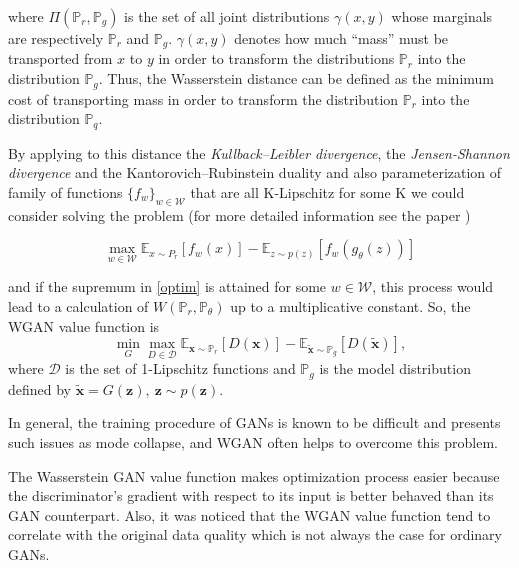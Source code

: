 \documentclass{webofc}
\begin{document}
where $\Pi(\mathbb{P}_r, \mathbb{P}_g)$ is the set of all joint distributions $\gamma(x, y)$ whose marginals are respectively $\mathbb{P}_r$ and $\mathbb{P}_g$. $\gamma(x, y)$ denotes how much “mass” must be transported from $x$ to $y$ in order to transform the distributions $\mathbb{P}_r$ into the distribution $\mathbb{P}_g$. Thus, the Wasserstein distance can be defined as the minimum cost of transporting mass in order to transform the distribution $\mathbb{P}_r$ into the distribution $\mathbb{P}_q$. 

By applying to this distance the \emph{Kullback--Leibler divergence}, the \emph{Jensen-Shannon divergence} and the Kantorovich--Rubinstein duality and also parameterization of family of functions $\{f_w\}_{w \in \mathcal{W}}$ that are all K-Lipschitz for some K we could consider solving the problem (for more detailed information see the paper \cite{arjovsky2017wasserstein})

\begin{equation}\label{optim}
\max_{w \in \mathcal{W}} \mathbb{E}_{x \sim P_r}[f_w(x)] - \mathbb{E}_{z\sim p(z)} [f_w(g_\theta(z))]
\end{equation}

and if the supremum in \eqref{optim} is attained for some $w \in \mathcal{W}$, this process would lead to a calculation of $W(\mathbb{P}_r, \mathbb{P}_\theta)$ up to a multiplicative constant.
So, the WGAN value function is
\begin{equation}\label{wgan_loss}
\min_G \max_{D \in \mathcal{D}}  \mathbb{E}_{\textbf{x} \sim \mathbb{P}_r}  [D(\textbf{x})] - \mathbb{E}_{\tilde{\textbf{x}} \sim \mathbb{P}_g} [D(\tilde{\textbf{x}})],
\end{equation}
where $\mathcal{D}$ is the set of 1-Lipschitz functions and $\mathbb{P}_g$ is  the model distribution defined by $\tilde{\textbf{x}} = G(\textbf{z}), ~\textbf{z} \sim p(\textbf{z}).$

In general, the training procedure of GANs is known to be difficult and presents such issues as mode collapse, and WGAN often helps to overcome this problem.

The Wasserstein GAN value function makes optimization process easier because the discriminator's gradient with respect to its input is better behaved than its GAN counterpart. Also, it was noticed that the WGAN value function tend to correlate with the original data quality which is not always the case for ordinary GANs.
\end{document}
